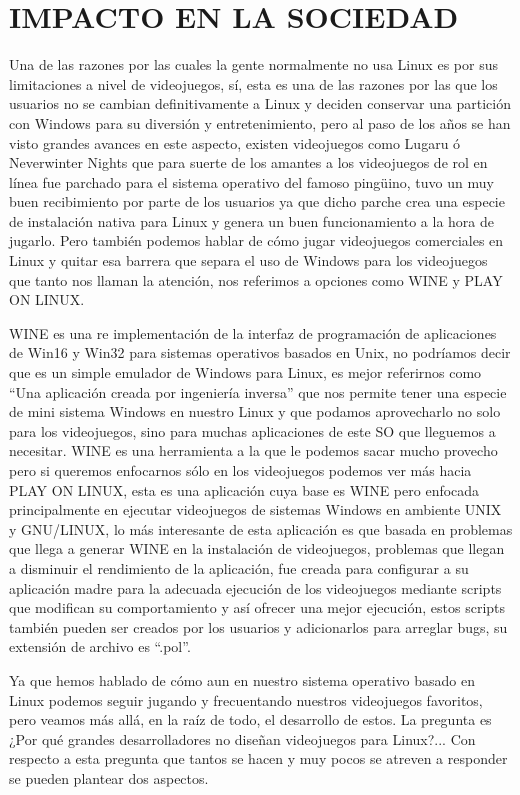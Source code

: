 \section*{IMPACTO EN LA SOCIEDAD}

Una de las razones por las cuales la gente normalmente no usa
Linux es por sus limitaciones a nivel de videojuegos, sí, esta es
una de las razones por las que los usuarios no se cambian
definitivamente a Linux y deciden conservar una partición con
Windows para su diversión y entretenimiento, pero al paso de
los años se han visto grandes avances en este aspecto, existen
videojuegos como Lugaru ó Neverwinter Nights que para suerte
de los amantes a los videojuegos de rol en línea fue parchado
para el sistema operativo del famoso pingüino, tuvo un muy
buen recibimiento por parte de los usuarios ya que dicho parche
crea una especie de instalación nativa para Linux y genera un
buen funcionamiento a la hora de jugarlo. Pero también
podemos hablar de cómo jugar videojuegos comerciales en
Linux y quitar esa barrera que separa el uso de Windows para
los videojuegos que tanto nos llaman la atención, nos referimos
a opciones como WINE y PLAY ON LINUX.

WINE es una re implementación de la interfaz de programación
de aplicaciones de Win16 y Win32 para sistemas operativos
basados en Unix, no podríamos decir que es un simple emulador
de Windows para Linux, es mejor referirnos como “Una
aplicación creada por ingeniería inversa” que nos permite tener
una especie de mini sistema Windows en nuestro Linux y que
podamos aprovecharlo no solo para los videojuegos, sino para
muchas aplicaciones de este SO que lleguemos a necesitar.
WINE es una herramienta a la que le podemos sacar mucho
provecho pero si queremos enfocarnos sólo en los videojuegos
podemos ver más hacia PLAY ON LINUX, esta es una aplicación
cuya base es WINE pero enfocada principalmente en ejecutar
videojuegos de sistemas Windows en ambiente UNIX y
GNU/LINUX, lo más interesante de esta aplicación es que
basada en problemas que llega a generar WINE en la instalación
de videojuegos, problemas que llegan a disminuir el rendimiento
de la aplicación, fue creada para configurar a su aplicación
madre para la adecuada ejecución de los videojuegos mediante
scripts que modifican su comportamiento y así ofrecer una mejor
ejecución, estos scripts también pueden ser creados por los
usuarios y adicionarlos para arreglar bugs, su extensión de
archivo es “.pol”.

Ya que hemos hablado de cómo aun en nuestro sistema
operativo basado en Linux podemos seguir jugando y
frecuentando nuestros videojuegos favoritos, pero veamos más
allá, en la raíz de todo, el desarrollo de estos. La pregunta es
¿Por qué grandes desarrolladores no diseñan videojuegos para
Linux?... Con respecto a esta pregunta que tantos se hacen y
muy pocos se atreven a responder se pueden plantear dos
aspectos.

